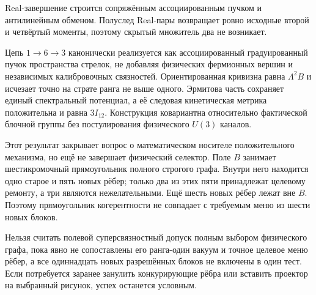 Real-завершение строится сопряжённым ассоциированным пучком и антилинейным
обменом. Полуслед Real-пары возвращает ровно исходные второй и четвёртый
моменты, поэтому скрытый множитель два не возникает.

\begin{theorem}
Цепь $1\to6\to3$ канонически реализуется как ассоциированный
градуированный пучок пространства стрелок, не добавляя физических
фермионных вершин и независимых калибровочных связностей. Ориентированная
кривизна равна $\Lambda^2B$ и исчезает точно на страте ранга не выше
одного. Эрмитова часть сохраняет единый спектральный потенциал, а её
следовая кинетическая метрика положительна и равна $3I_{12}$. Конструкция
ковариантна относительно фактической блочной группы без постулирования
физического $U(3)$ каналов.
\end{theorem}

Этот результат закрывает вопрос о математическом носителе положительного
механизма, но ещё не завершает физический селектор. Поле $B$ занимает
шестикромочный прямоугольник полного строгого графа. Внутри него находится
одно старое и пять новых рёбер; только два из этих пяти принадлежат целевому
ремонту, а три являются нежелательными. Ещё шесть новых рёбер лежат вне
$B$. Поэтому прямоугольник когерентности не совпадает с требуемым меню из
шести новых блоков.

\begin{nogocriterion}
Нельзя считать полевой суперсвязностный допуск полным выбором физического
графа, пока явно не сопоставлены его ранга-один вакуум и точное целевое
меню рёбер, а все одиннадцать новых разрешённых блоков не включены в один
тест. Если потребуется заранее занулить конкурирующие рёбра или вставить
проектор на выбранный рисунок, успех останется условным.
\end{nogocriterion}

